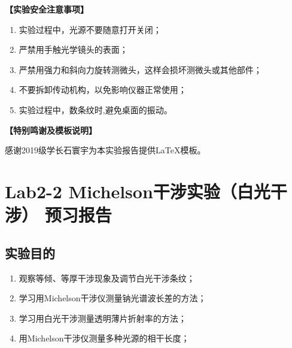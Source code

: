 \documentclass[dvipsnames, svgnames,a4paper,11pt]{article}
\begin{document}
	\textbf{【实验安全注意事项】}	
	\begin{enumerate}
		\item 实验过程中，光源不要随意打开关闭；
		\item 严禁用手触光学镜头的表面；
		\item 严禁用强力和斜向力旋转测微头，这样会损坏测微头或其他部件；
		\item 不要拆卸传动机构，以免影响仪器正常使用；
		\item 实验过程中，数条纹时,避免桌面的振动。
	\end{enumerate}
	
	
	\textbf{【特别鸣谢及模板说明】}	
	
	感谢2019级学长石寰宇为本实验报告提供\LaTeX 模板。%
	
	
	
	\clearpage
	\tableofcontents
	\clearpage
	
	
	
	
	\setcounter{section}{0}
	\section{Lab2-2 Michelson干涉实验（白光干涉） \quad\heiti 预习报告}
	
	\subsection{实验目的}
	\begin{enumerate}
		\item 观察等倾、等厚干涉现象及调节白光干涉条纹；
		\item 学习用Michelson干涉仪测量钠光谱波长差的方法；
		\item 学习用白光干涉测量透明薄片折射率的方法；
		\item 用Michelson干涉仪测量多种光源的相干长度；
	\end{enumerate}
	
\end{document}
